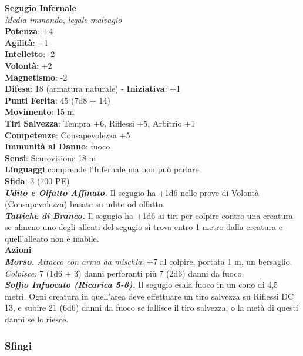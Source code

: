 \begin{multicols}{2}
\medskip\textbf{Segugio Infernale}\\
\emph{Media immondo, legale malvagio}\\
\textbf{Potenza}: +4\\
\textbf{Agilità}: +1\\
\textbf{Intelletto}: -2\\
\textbf{Volontà}: +2\\
\textbf{Magnetismo}: -2\\
\textbf{Difesa}: 18 (armatura naturale) - \textbf{Iniziativa}: +1\\
\textbf{Punti Ferita}: 45 (7d8 + 14)\\
\textbf{Movimento}: 15 m\\
\textbf{Tiri Salvezza}: Tempra +6, Riflessi +5, Arbitrio +1\\
\textbf{Competenze}: Consapevolezza +5\\
\textbf{Immunità al Danno}: fuoco\\
\textbf{Sensi}: Scurovisione 18 m\\
\textbf{Linguaggi} comprende l'Infernale ma non può parlare\\
\textbf{Sfida}: 3 (700 PE)\smallskip\\
\emph{\textbf{Udito e Olfatto Affinato.}} Il segugio ha +1d6 nelle prove di Volontà (Consapevolezza) basate su udito od olfatto.\\
\emph{\textbf{Tattiche di Branco.}} Il segugio ha +1d6 ai tiri per colpire contro una creatura se almeno uno degli alleati del segugio si trova entro 1 metro dalla creatura e quell'alleato non è inabile.\\
\smallskip\textbf{Azioni}\\
\emph{\textbf{Morso.} Attacco con arma da mischia}: +7 al colpire, portata 1 m, un bersaglio.\\
\emph{Colpisce:} 7 (1d6 + 3) danni perforanti più 7 (2d6) danni da fuoco.\\
\emph{\textbf{Soffio Infuocato (Ricarica 5-6).}} Il segugio esala fuoco in un cono di 4,5 metri. Ogni creatura in quell'area deve effettuare un tiro salvezza su Riflessi DC  13, e subire 21 (6d6) danni da fuoco se fallisce il tiro salvezza, o la metà di questi danni se lo riesce.\\

\subsubsection{Sfingi}


\end{multicols}
